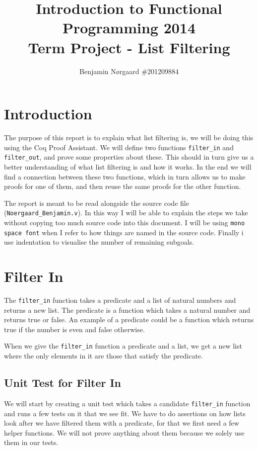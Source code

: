 \documentclass{article}
\title{
Introduction to Functional Programming 2014\\
Term Project - List Filtering
}
\author{
  Benjamin Nørgaard \#201209884\\
}
\begin{document}
\maketitle
\clearpage
\tableofcontents
\clearpage
\section{Introduction}
The purpose of this report is to explain what list filtering is, we will be doing this using the Coq Proof Assistant. We will define two functions \texttt{filter\_in} and \texttt{filter\_out}, and prove some properties about these. This should in turn give us a better understanding of what list filtering is and how it works. In the end we will find a connection between these two functions, which in turn allows us to make proofs for one of them, and then reuse the same proofs for the other function.

The report is meant to be read alongside the source code file (\texttt{Noergaard\_Benjamin.v}). In this way I will be able to explain the steps we take without copying too much source code into this document. I will be using \texttt{mono space font} when I refer to how things are named in the source code. Finally i use indentation to visualise the number of remaining subgoals.

\section{Filter In}
The \texttt{filter\_in} function takes a predicate and a list of natural numbers and returns a new list. The predicate is a function which takes a natural number and returns true or false. An example of a predicate could be a function which returns true if the number is even and false otherwise.

When we give the \texttt{filter\_in} function a predicate and a list, we get a new list where the only elements in it are those that satisfy the predicate.

\subsection{Unit Test for Filter In}
We will start by creating a unit test which takes a candidate \texttt{filter\_in} function and runs a few tests on it that we see fit. We have to do assertions on how lists look after we have filtered them with a predicate, for that we first need a few helper functions. We will not prove anything about them because we solely use them in our tests.
\end{document}
